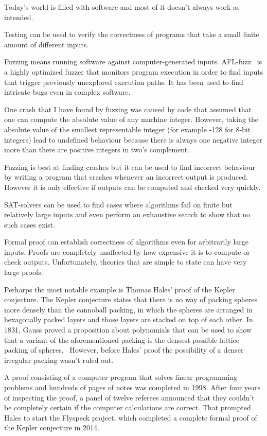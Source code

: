 \documentclass[english, 12pt, a4paper, sci, a-1b, online]{aaltothesis}
\begin{document}
Today's world is filled with software and most of it doesn't always work as intended.

Testing can be used to verify the correctness of programs that take a small finite amount of different inputs.

Fuzzing means running software against computer-generated inputs. AFL-fuzz~\cite{AFL} is a highly optimized fuzzer that monitors program execution in order to find inputs that trigger previously unexplored execution paths. It has been used to find intricate bugs even in complex software.

One crash that I have found by fuzzing was caused by code that assumed that one can compute the absolute value of any machine integer. However, taking the absolute value of the smallest representable integer (for example -128 for 8-bit integers) lead to undefined behaviour because there is always one negative integer more than there are positive integers in two's complement.

Fuzzing is best at finding crashes but it can be used to find incorrect behaviour by writing a program that crashes whenever an incorrect output is produced. However it is only effective if outputs can be computed and checked very quickly.

SAT-solvers can be used to find cases where algorithms fail on finite but relatively large inputs and even perform an exhaustive search to show that no such cases exist.

Formal proof can establish correctness of algorithms even for arbitrarily large inputs. Proofs are completely unaffected by how expensive it is to compute or check outputs. Unfortunately, theories that are simple to state can have very large proofs.

Perharps the most notable example is Thomas Hales' proof of the Kepler conjecture. The Kepler conjecture states that there is no way of packing spheres more densely than the cannoball packing, in which the spheres are arranged in hexagonally packed layers and those layers are stacked on top of each other. In 1831, Gauss proved a proposition about polynomials that can be used to show that a variant of the aforementioned packing is the densest possible lattice packing of spheres.~\cite{dichteste} However, before Hales' proof the possibility of a denser irregular packing wasn't ruled out.

A proof consisting of a computer program that solves linear programming problems and hundreds of pages of notes was completed in 1998. After four years of inspecting the proof, a panel of twelve referees announced that they couldn't be completely certain if the computer calculations are correct. That prompted Hales to start the Flyspeck project, which completed a complete formal proof of the Kepler conjecture in 2014.
\end{document}
